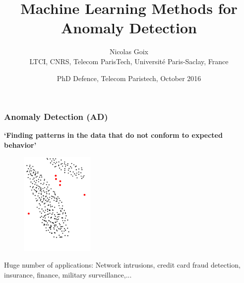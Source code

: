 \documentclass[10pt]{beamer}
\title{
Machine Learning Methods for Anomaly Detection
}
\author[Nicolas Goix]{ Nicolas Goix \\
 {\tiny LTCI, CNRS, Telecom ParisTech, Université Paris-Saclay, France 
 }
}
\date{PhD Defence, Telecom Paristech, October 2016}
\begin{document}
\begin{frame}
 \titlepage
\end{frame}








\begin{frame}
\frametitle{Anomaly Detection (AD)}

\textbf{`Finding patterns in the data that do not conform to expected behavior'}
\begin{figure}
\includegraphics[height=5cm]{AD_intro.png}
\end{figure}
Huge number of applications: Network intrusions, credit card fraud detection, insurance, finance, military surveillance,... \\~\\
\end{frame}
\end{document}

